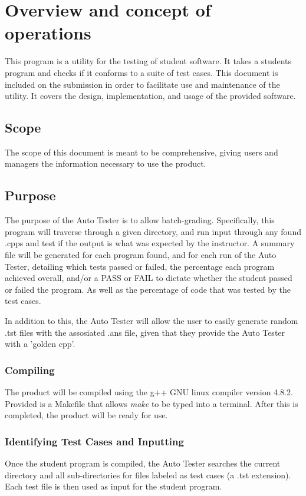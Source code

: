
\chapter{Overview and concept of operations}
This program is a utility for the testing of student software. It takes a students program 
and checks if it conforms to a suite of test cases. This document is included on the 
submission in order to facilitate use and maintenance of the utility. It covers the 
design, implementation, and usage of the provided software.


\section{Scope}
The scope of this document is meant to be comprehensive, giving users and managers the 
information necessary to use the product.


\section{Purpose}
The purpose of the Auto Tester is to allow batch-grading. Specifically, this program 
will traverse through a given directory, and run input through any found .cpps and 
test if the output is what was expected by the instructor. A summary file will be 
generated for each program found, and for each run of the Auto Tester, 
detailing which tests passed or failed, the percentage each program achieved overall, and/or 
a PASS or FAIL to dictate whether the student passed or failed the program. As well as the percentage of code that was tested by the test cases.

 In addition to this, 
the Auto Tester will allow the user to easily generate random .tst files with the assosiated .ans 
file, given that they provide the Auto Tester with a 'golden cpp'.

\subsection{Compiling}
The product will be compiled using the g++ GNU linux compiler
version 4.8.2. Provided is a Makefile that allows \textit{make} to be typed into a terminal. After this is completed, the product will be ready for use.


\subsection{Identifying Test Cases and Inputting}
Once the student program is compiled, the Auto Tester searches the current directory and all 
sub-directories for files labeled as test cases (a .tst extension). Each test file is then 
used as input for the student program.


